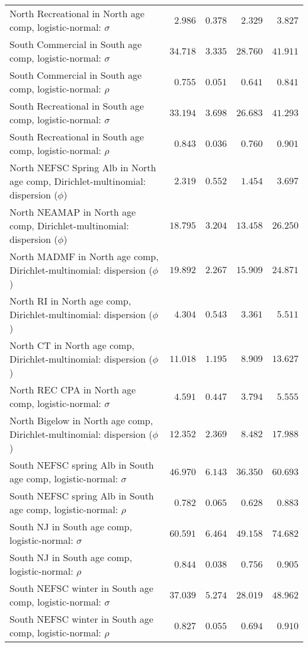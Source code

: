 \documentclass[
]{article}
\begin{document}
\begin{landscape}
\begin{longtable}[t]{lrrrr}
North Recreational in North age comp, logistic-normal: $\sigma$ & $2.986$ & $0.378$ & $2.329$ & $3.827$\\
South Commercial in South age comp, logistic-normal: $\sigma$ & $34.718$ & $3.335$ & $28.760$ & $41.911$\\
South Commercial in South age comp, logistic-normal: $\rho$ & $0.755$ & $0.051$ & $0.641$ & $0.841$\\
\addlinespace
South Recreational in South age comp, logistic-normal: $\sigma$ & $33.194$ & $3.698$ & $26.683$ & $41.293$\\
South Recreational in South age comp, logistic-normal: $\rho$ & $0.843$ & $0.036$ & $0.760$ & $0.901$\\
North NEFSC Spring Alb in North age comp, Dirichlet-multinomial: dispersion ($\phi$) & $2.319$ & $0.552$ & $1.454$ & $3.697$\\
North NEAMAP in North age comp, Dirichlet-multinomial: dispersion ($\phi$) & $18.795$ & $3.204$ & $13.458$ & $26.250$\\
North MADMF in North age comp, Dirichlet-multinomial: dispersion ($\phi$) & $19.892$ & $2.267$ & $15.909$ & $24.871$\\
\addlinespace
North RI in North age comp, Dirichlet-multinomial: dispersion ($\phi$) & $4.304$ & $0.543$ & $3.361$ & $5.511$\\
North CT in North age comp, Dirichlet-multinomial: dispersion ($\phi$) & $11.018$ & $1.195$ & $8.909$ & $13.627$\\
North REC CPA in North age comp, logistic-normal: $\sigma$ & $4.591$ & $0.447$ & $3.794$ & $5.555$\\
North Bigelow in North age comp, Dirichlet-multinomial: dispersion ($\phi$) & $12.352$ & $2.369$ & $8.482$ & $17.988$\\
South NEFSC spring Alb in South age comp, logistic-normal: $\sigma$ & $46.970$ & $6.143$ & $36.350$ & $60.693$\\
\addlinespace
South NEFSC spring Alb in South age comp, logistic-normal: $\rho$ & $0.782$ & $0.065$ & $0.628$ & $0.883$\\
South NJ in South age comp, logistic-normal: $\sigma$ & $60.591$ & $6.464$ & $49.158$ & $74.682$\\
South NJ in South age comp, logistic-normal: $\rho$ & $0.844$ & $0.038$ & $0.756$ & $0.905$\\
South NEFSC winter in South age comp, logistic-normal: $\sigma$ & $37.039$ & $5.274$ & $28.019$ & $48.962$\\
South NEFSC winter in South age comp, logistic-normal: $\rho$ & $0.827$ & $0.055$ & $0.694$ & $0.910$\\

\end{longtable}
\end{landscape}
\end{document}
